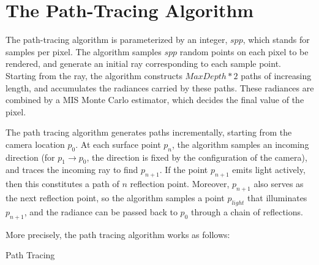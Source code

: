 \section{The Path-Tracing Algorithm}

The path-tracing algorithm is parameterized by an integer, $spp$, which stands for samples per pixel. The algorithm samples $spp$ random points on each pixel to be rendered, and generate an initial ray corresponding to each sample point. Starting from the ray, the algorithm constructs $MaxDepth*2$ paths of increasing length, and accumulates the radiances carried by these paths. These radiances are combined by a MIS Monte Carlo estimator, which decides the final value of the pixel.

The path tracing algorithm generates paths incrementally, starting from the camera location $p_0$. At each surface point $p_n$, the algorithm samples an incoming direction (for $p_{1}\to p_0$, the direction is fixed by the configuration of the camera), and traces the incoming ray to find $p_{n+1}$. If the point $p_{n+1}$ emits light actively, then this constitutes a path of $n$ reflection point. Moreover, $p_{n+1}$ also serves as the next reflection point, so the algorithm samples a point $p_{light}$ that illuminates $p_{n+1}$, and the radiance can be passed back to $p_0$ through a chain of reflections.


More precisely, the path tracing algorithm works as follows:


\begin{algorithm}[H]
    \label{Path Tracing}
    \caption{Path Tracing}
\end{algorithm}

